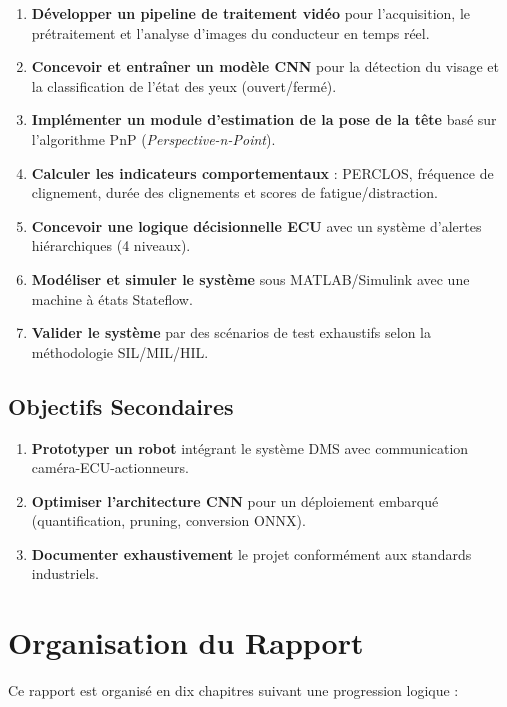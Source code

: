 \documentclass[12pt,a4paper,twoside]{report}
\begin{document}
\begin{enumerate}[leftmargin=2cm]
    \item \textbf{Développer un pipeline de traitement vidéo} pour l'acquisition, le prétraitement et l'analyse d'images du conducteur en temps réel.
    \item \textbf{Concevoir et entraîner un modèle CNN} pour la détection du visage et la classification de l'état des yeux (ouvert/fermé).
    \item \textbf{Implémenter un module d'estimation de la pose de la tête} basé sur l'algorithme PnP (\textit{Perspective-n-Point}).
    \item \textbf{Calculer les indicateurs comportementaux} : PERCLOS, fréquence de clignement, durée des clignements et scores de fatigue/distraction.
    \item \textbf{Concevoir une logique décisionnelle ECU} avec un système d'alertes hiérarchiques (4 niveaux).
    \item \textbf{Modéliser et simuler le système} sous MATLAB/Simulink avec une machine à états Stateflow.
    \item \textbf{Valider le système} par des scénarios de test exhaustifs selon la méthodologie SIL/MIL/HIL.
\end{enumerate}

\subsection{Objectifs Secondaires}

\begin{enumerate}[leftmargin=2cm]
    \item \textbf{Prototyper un robot} intégrant le système DMS avec communication caméra-ECU-actionneurs.
    \item \textbf{Optimiser l'architecture CNN} pour un déploiement embarqué (quantification, pruning, conversion ONNX).
    \item \textbf{Documenter exhaustivement} le projet conformément aux standards industriels.
\end{enumerate}

\section{Organisation du Rapport}

Ce rapport est organisé en dix chapitres suivant une progression logique :
\end{document}
